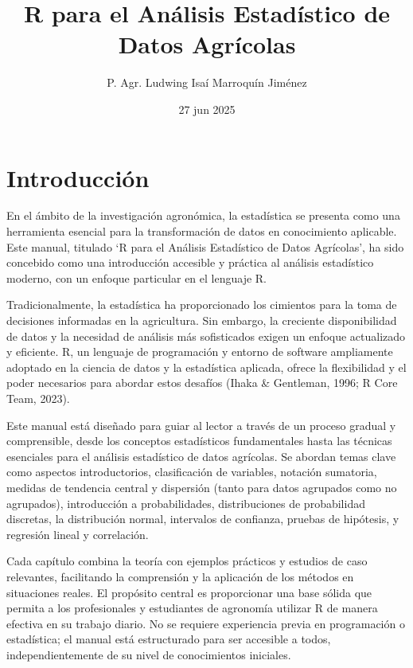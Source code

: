 \documentclass[
  spanish,
  letterpaper,
]{book}
\title{R para el Análisis Estadístico de Datos Agrícolas}
\author{P. Agr. Ludwing Isaí Marroquín Jiménez}
\date{27 jun 2025}
\renewcommand*\contentsname{Tabla de contenidos}
\newcommand\contentsname{Tabla de contenidos}
\begin{document}
\frontmatter
\maketitle

\renewcommand*\contentsname{Tabla de contenidos}
{
\hypersetup{linkcolor=}
\setcounter{tocdepth}{2}
\tableofcontents
}
\listoffigures
\listoftables

\mainmatter
{}

\chapter*{Introducción}\label{introducciuxf3n}


En el ámbito de la investigación agronómica, la estadística se presenta
como una herramienta esencial para la transformación de datos en
conocimiento aplicable. Este manual, titulado `R para el Análisis
Estadístico de Datos Agrícolas', ha sido concebido como una introducción
accesible y práctica al análisis estadístico moderno, con un enfoque
particular en el lenguaje R.

Tradicionalmente, la estadística ha proporcionado los cimientos para la
toma de decisiones informadas en la agricultura. Sin embargo, la
creciente disponibilidad de datos y la necesidad de análisis más
sofisticados exigen un enfoque actualizado y eficiente. R, un lenguaje
de programación y entorno de software ampliamente adoptado en la ciencia
de datos y la estadística aplicada, ofrece la flexibilidad y el poder
necesarios para abordar estos desafíos (Ihaka \& Gentleman, 1996; R Core
Team, 2023).

Este manual está diseñado para guiar al lector a través de un proceso
gradual y comprensible, desde los conceptos estadísticos fundamentales
hasta las técnicas esenciales para el análisis estadístico de datos
agrícolas. Se abordan temas clave como aspectos introductorios,
clasificación de variables, notación sumatoria, medidas de tendencia
central y dispersión (tanto para datos agrupados como no agrupados),
introducción a probabilidades, distribuciones de probabilidad discretas,
la distribución normal, intervalos de confianza, pruebas de hipótesis, y
regresión lineal y correlación.

Cada capítulo combina la teoría con ejemplos prácticos y estudios de
caso relevantes, facilitando la comprensión y la aplicación de los
métodos en situaciones reales. El propósito central es proporcionar una
base sólida que permita a los profesionales y estudiantes de agronomía
utilizar R de manera efectiva en su trabajo diario. No se requiere
experiencia previa en programación o estadística; el manual está
estructurado para ser accesible a todos, independientemente de su nivel
de conocimientos iniciales.
\end{document}
